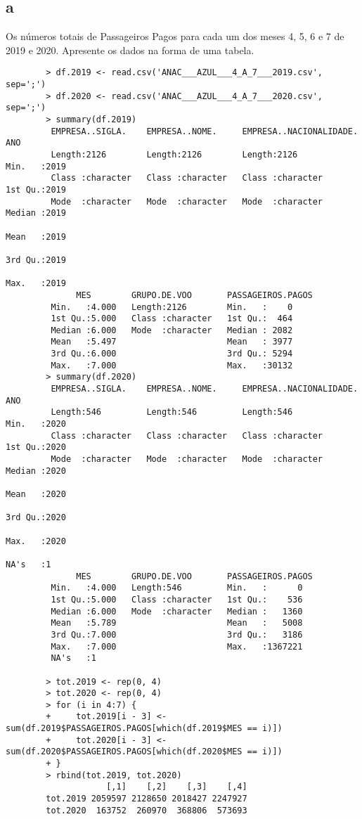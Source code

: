\documentclass{article}[twocolumn]
\begin{document}
	\subsection{a}
	Os números totais de Passageiros Pagos para cada um dos meses 4, 5, 6 e 7 de 2019
	e 2020. Apresente os dados na forma de uma tabela.
	\begin{verbatim}
		> df.2019 <- read.csv('ANAC___AZUL___4_A_7___2019.csv', sep=';')
		> df.2020 <- read.csv('ANAC___AZUL___4_A_7___2020.csv', sep=';')
		> summary(df.2019)
		 EMPRESA..SIGLA.    EMPRESA..NOME.     EMPRESA..NACIONALIDADE.      ANO      
		 Length:2126        Length:2126        Length:2126             Min.   :2019  
		 Class :character   Class :character   Class :character        1st Qu.:2019  
		 Mode  :character   Mode  :character   Mode  :character        Median :2019  
		                                                               Mean   :2019  
		                                                               3rd Qu.:2019  
		                                                               Max.   :2019  
		      MES        GRUPO.DE.VOO       PASSAGEIROS.PAGOS
		 Min.   :4.000   Length:2126        Min.   :    0    
		 1st Qu.:5.000   Class :character   1st Qu.:  464    
		 Median :6.000   Mode  :character   Median : 2082    
		 Mean   :5.497                      Mean   : 3977    
		 3rd Qu.:6.000                      3rd Qu.: 5294    
		 Max.   :7.000                      Max.   :30132    
		> summary(df.2020)
		 EMPRESA..SIGLA.    EMPRESA..NOME.     EMPRESA..NACIONALIDADE.      ANO      
		 Length:546         Length:546         Length:546              Min.   :2020  
		 Class :character   Class :character   Class :character        1st Qu.:2020  
		 Mode  :character   Mode  :character   Mode  :character        Median :2020  
		                                                               Mean   :2020  
		                                                               3rd Qu.:2020  
		                                                               Max.   :2020  
		                                                               NA's   :1     
		      MES        GRUPO.DE.VOO       PASSAGEIROS.PAGOS
		 Min.   :4.000   Length:546         Min.   :      0  
		 1st Qu.:5.000   Class :character   1st Qu.:    536  
		 Median :6.000   Mode  :character   Median :   1360  
		 Mean   :5.789                      Mean   :   5008  
		 3rd Qu.:7.000                      3rd Qu.:   3186  
		 Max.   :7.000                      Max.   :1367221  
		 NA's   :1

		> tot.2019 <- rep(0, 4)
		> tot.2020 <- rep(0, 4)
		> for (i in 4:7) {
		+     tot.2019[i - 3] <- sum(df.2019$PASSAGEIROS.PAGOS[which(df.2019$MES == i)])
		+     tot.2020[i - 3] <- sum(df.2020$PASSAGEIROS.PAGOS[which(df.2020$MES == i)])
		+ }
		> rbind(tot.2019, tot.2020)
		            [,1]    [,2]    [,3]    [,4]
		tot.2019 2059597 2128650 2018427 2247927
		tot.2020  163752  260970  368806  573693
	\end{verbatim}
\end{document}
